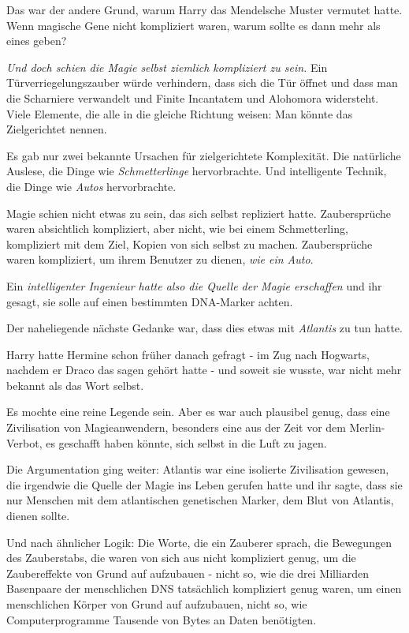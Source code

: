 Das war der andere Grund, warum Harry das Mendelsche Muster vermutet hatte. Wenn
magische Gene nicht kompliziert waren, warum sollte es dann mehr als eines
geben?

\emph{Und doch schien die Magie selbst ziemlich kompliziert zu sein.} Ein
Türverriegelungszauber würde verhindern, dass sich die Tür öffnet und dass man
die Scharniere verwandelt und Finite Incantatem und Alohomora widersteht. Viele
Elemente, die alle in die gleiche Richtung weisen: Man könnte das Zielgerichtet
nennen.

Es gab nur zwei bekannte Ursachen für zielgerichtete Komplexität. Die natürliche
Auslese, die Dinge wie \emph{Schmetterlinge} hervorbrachte. Und intelligente
Technik, die Dinge wie \emph{Autos} hervorbrachte.

Magie schien nicht etwas zu sein, das sich selbst repliziert hatte.
Zaubersprüche waren absichtlich kompliziert, aber nicht, wie bei einem
Schmetterling, kompliziert mit dem Ziel, Kopien von sich selbst zu machen.
Zaubersprüche waren kompliziert, um ihrem Benutzer zu dienen, \emph{wie ein
Auto}.

Ein \emph{intelligenter Ingenieur hatte also die Quelle der Magie erschaffen}
und ihr gesagt, sie solle auf einen bestimmten DNA-Marker achten.

Der naheliegende nächste Gedanke war, dass dies etwas mit \emph{\glqq{}
Atlantis\grqq{}} zu tun hatte.

Harry hatte Hermine schon früher danach gefragt - im Zug nach Hogwarts, nachdem
er Draco das sagen gehört hatte - und soweit sie wusste, war nicht mehr bekannt
als das Wort selbst.

Es mochte eine reine Legende sein. Aber es war auch plausibel genug, dass eine
Zivilisation von Magieanwendern, besonders eine aus der Zeit vor dem
Merlin-Verbot, es geschafft haben könnte, sich selbst in die Luft zu jagen.

Die Argumentation ging weiter: Atlantis war eine isolierte Zivilisation gewesen,
die irgendwie die Quelle der Magie ins Leben gerufen hatte und ihr sagte, dass
sie nur Menschen mit dem atlantischen genetischen Marker, dem Blut von Atlantis,
dienen sollte.

Und nach ähnlicher Logik: Die Worte, die ein Zauberer sprach, die Bewegungen des
Zauberstabs, die waren von sich aus nicht kompliziert genug, um die
Zaubereffekte von Grund auf aufzubauen - nicht so, wie die drei Milliarden
Basenpaare der menschlichen DNS tatsächlich kompliziert genug waren, um einen
menschlichen Körper von Grund auf aufzubauen, nicht so, wie Computerprogramme
Tausende von Bytes an Daten benötigten.

